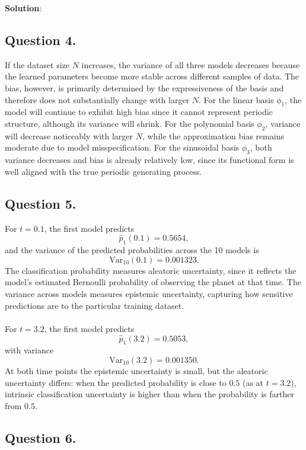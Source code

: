\documentclass[submit]{../harvardml}
\newenvironment{solution}{
    \vspace{2mm}
    \color{blue}\noindent\textbf{Solution}:
}{}
\begin{document}
\begin{solution}
\subsection{Question 4.}

If the dataset size $N$ increases, the variance of all three models decreases because the learned parameters become more stable across different samples of data. The bias, however, is primarily determined by the expressiveness of the basis and therefore does not substantially change with larger $N$. For the linear basis $\phi_1$, the model will continue to exhibit high bias since it cannot represent periodic structure, although its variance will shrink. For the polynomial basis $\phi_2$, variance will decrease noticeably with larger $N$, while the approximation bias remains moderate due to model misspecification. For the sinusoidal basis $\phi_3$, both variance decreases and bias is already relatively low, since its functional form is well aligned with the true periodic generating process.

\subsection{Question 5.}

For $t=0.1$, the first model predicts
\[
\hat p_1(0.1)=0.5654,
\]
and the variance of the predicted probabilities across the 10 models is
\[
\mathrm{Var}_{10}(0.1)=0.001323.
\]
The classification probability measures aleatoric uncertainty, since it reflects the model's estimated Bernoulli probability of observing the planet at that time.
The variance across models measures epistemic uncertainty, capturing how sensitive predictions are to the particular training dataset.
\\\\
For $t=3.2$, the first model predicts
\[
\hat p_1(3.2)=0.5053,
\]
with variance
\[
\mathrm{Var}_{10}(3.2)=0.001350.
\]
At both time points the epistemic uncertainty is small, but the aleatoric uncertainty differs: when the predicted probability is close to $0.5$ (as at $t=3.2$), intrinsic classification uncertainty is higher than when the probability is farther from $0.5$.

\subsection{Question 6.}


\end{solution}
\end{document}
